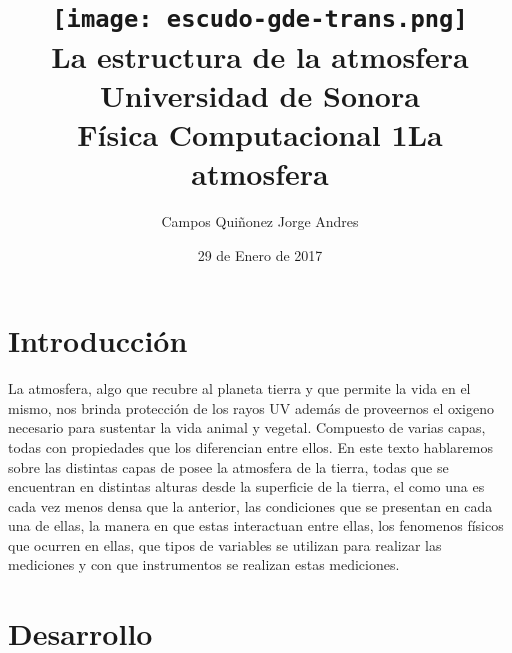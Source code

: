\documentclass{article}
\begin{document}
\begin{doublespace}
\title{\texttt{[image: escudo-gde-trans.png]}\\ \Huge La estructura de la atmosfera\\Universidad de Sonora\\Física Computacional 1}
\author{\huge Campos Quiñonez Jorge Andres}
\date{\Large 29 de Enero de 2017}
\maketitle
\end{doublespace}

\newpage
\mbox{}
\thispagestyle{empty}
\newpage

\section{\huge Introducción}
\Large La atmosfera, algo que recubre al planeta tierra y que permite la vida en el mismo, nos brinda protección de los rayos UV además de proveernos el oxigeno necesario para sustentar la vida animal y vegetal. Compuesto de varias capas, todas con propiedades que los diferencian entre ellos. En este texto hablaremos sobre las distintas capas de posee la atmosfera de la tierra, todas que se encuentran en distintas alturas desde la superficie de la tierra, el como una es cada vez menos densa que la anterior, las condiciones que se presentan en cada una de ellas, la manera en que estas interactuan entre ellas, los fenomenos físicos que ocurren en ellas, que tipos de variables se utilizan para realizar las mediciones y con que instrumentos se realizan estas mediciones. 

\newpage

\section{\Huge Desarrollo}
\hfill
\begin{flushleft}
\title{\huge La atmosfera}
\end{flushleft}
\end{document}

